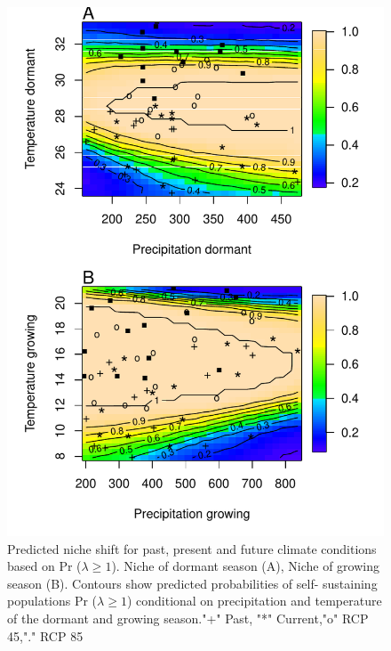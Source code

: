 \documentclass[12pt]{article}
\begin{document}
\begin{figure}[H]
  \begin{center}
    \includegraphics[width=0.85\linewidth]{Figures/niche.pdf}
  \caption{Predicted niche shift for past, present and future climate conditions based on Pr ($\lambda \geq 1$). Niche of dormant season (A), Niche of growing season (B). Contours show predicted probabilities of self- sustaining populations Pr ($\lambda \geq 1$) conditional on precipitation and temperature of the dormant and growing season."+" Past, "*" Current,"o" RCP 45,"." RCP 85}
  \label{fig:niche}
  \end{center}
\end{figure}
\end{document}
